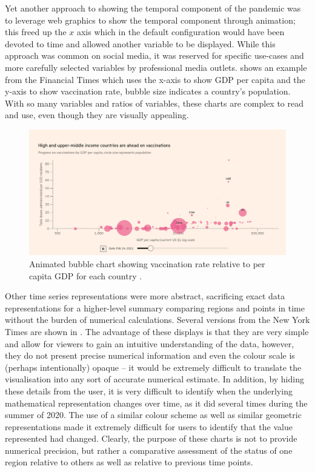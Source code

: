 \documentclass[article]{jdssv}\usepackage[]{graphicx}\usepackage[]{color}
\begin{document}
Yet another approach to showing the temporal component of the pandemic was to leverage web graphics to show the temporal component through animation; this freed up the $x$ axis which in the default configuration would have been devoted to time and allowed another variable to be displayed. While this approach was common on social media, it was reserved for specific use-cases and more carefully selected variables by professional media outlets.  shows an example from the Financial Times which uses the x-axis to show GDP per capita and the y-axis to show vaccination rate, bubble size indicates a country's population. With so many variables and ratios of variables, these charts are complex to read and use, even though they are visually appealing.

\begin{figure}
\centering
\includegraphics{ft_vaccine_bubble}
\caption{Animated bubble chart showing vaccination rate relative to per capita GDP for each country \citep{visualCovid19VaccineTracker}.}\label{fig:bubble-ft}
\end{figure}

Other time series representations were more abstract, sacrificing exact data representations for a higher-level summary comparing regions and points in time without the burden of numerical calculations. Several versions from the New York Times are shown in . The advantage of these displays is that they are very simple and allow for viewers to gain an intuitive understanding of the data, however, they do not present precise numerical information and even the colour scale is (perhaps intentionally) opaque -- it would be extremely difficult to translate the visualisation into any sort of accurate numerical estimate. In addition, by hiding these details from the user, it is very difficult to identify when the underlying mathematical representation changes over time, as it did several times during the summer of 2020. The use of a similar colour scheme as well as similar geometric representations made it extremely difficult for users to identify that the value represented had changed. Clearly, the purpose of these charts is not to provide numerical precision, but rather a comparative assessment of the status of one region relative to others as well as relative to previous time points. 
\end{document}
